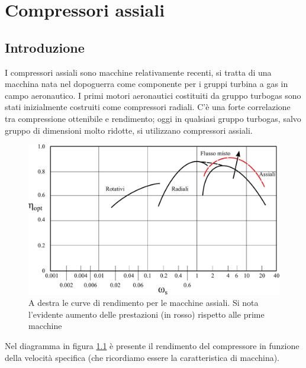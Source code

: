 \chapter{Compressori assiali}

\section{Introduzione}
I compressori assiali sono macchine relativamente recenti, si tratta di una macchina nata nel dopoguerra come componente per i gruppi turbina a gas in campo aeronautico. I primi motori aeronautici costituiti da gruppo turbogas sono stati inizialmente costruiti come compressori radiali. C'è una forte correlazione tra compressione ottenibile e rendimento; oggi in qualsiasi gruppo turbogas, salvo gruppo di dimensioni molto ridotte, si utilizzano compressori assiali. 
\begin{figure}[h!]
\centering
  \includegraphics[width=.8\textwidth]{fig/PrestComp.pdf}
\caption{A destra le curve di rendimento per le macchine assiali. Si nota l'evidente aumento delle prestazioni (in rosso) rispetto alle prime macchine}
\label{fig:PrestComp}
\end{figure}
Nel diagramma in figura \ref{fig:PrestComp} è presente il rendimento del compressore in funzione della velocità specifica (che ricordiamo essere la caratteristica di macchina).


